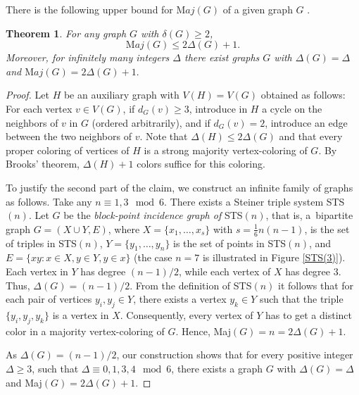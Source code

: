 \documentclass[11pt]{article}
\newtheorem{theorem}{Theorem}
\begin{document}
\vspace{4mm}
There is the following upper bound for ${\mathrm Maj}(G)$ of a given graph $G$ .
\begin{theorem}\label{2Delta+1}
For any graph $G$ with $\delta(G)\ge 2$, $${\mathrm Maj}(G) \le 2\Delta(G)+1.$$
Moreover, for infinitely many integers $\Delta$ there exist graphs $G$ with $\Delta(G)=\Delta$ and ${\mathrm Maj}(G) = 2\Delta(G)+1.$
\end{theorem}
\begin{proof}
Let $H$ be an auxiliary graph with $V(H)=V(G)$ obtained as follows:  For each vertex $v\in V(G)$, if $d_G(v)\ge 3$, introduce in $H$ a cycle on the neighbors of $v$ in $G$ (ordered arbitrarily), and if $d_G(v)=2$, introduce an edge between the two neighbors of $v$.  Note that $\Delta(H)\le 2\Delta(G)$ and that every proper coloring of vertices of $H$ is a strong majority vertex-coloring of $G$. By Brooks' theorem, $\Delta(H)+1$ colors suffice for this coloring.

To justify the second part of the claim, we construct an infinite family of graphs as follows. Take any $n\equiv 1, 3 \mod{6}$. There exists a Steiner triple system STS$(n)$. Let $G$ be the {\it block-point incidence graph of } STS$(n)$, that is, a~bipartite graph $G=(X\cup Y,E)$, where $X=\{x_1,\ldots,x_s\}$ with $s=\frac 16 n(n-1)$, is the set of triples in STS$(n)$, $Y=\{y_1,\ldots,y_n\}$ is the set of points in STS$(n)$, and $E=\{xy: x\in X,y\in Y, y\in x\}$ (the case $n=7$ is illustrated in Figure \ref{STS(3)}). Each vertex in $Y$ has degree $(n-1)/ 2$, while each vertex of $X$ has degree 3. Thus, $\Delta(G)=(n-1)/ 2$. From the definition of STS$(n)$ it follows that for each pair of vertices $y_i,y_j\in Y$, there exists a vertex $y_k\in Y$ such that the triple $\{y_i,y_j,y_k\}$ is a vertex in $X$. Consequently, every vertex of $Y$ has to get a distinct color in a majority vertex-coloring of $G$. Hence, Maj$(G)=n=2\Delta(G)+1$. 

As $\Delta(G)=(n-1)/ 2$, our construction shows that for every positive integer $\Delta\ge 3$, such that $\Delta\equiv 0,1,3,4 \mod 6$, there exists a graph $G$ with $\Delta(G)=\Delta$ and Maj$(G)=2\Delta(G)+1$.
\end{proof}






 
\end{document}
